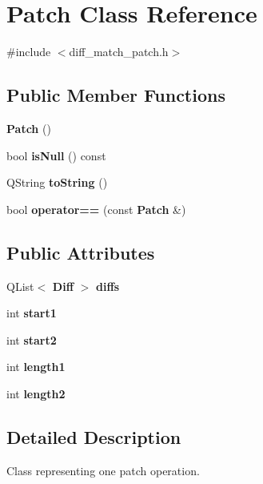 \section{Patch Class Reference}
\label{class_patch}


{\ttfamily \#include $<$diff\_\-match\_\-patch.h$>$}

\subsection*{Public Member Functions}
\begin{DoxyCompactItemize}
\item 
{\bf Patch} ()
\item 
bool {\bfseries isNull} () const \label{class_patch_afdc9aba846465494845201a26d0fc20f}

\item 
QString {\bf toString} ()
\item 
bool {\bfseries operator==} (const {\bf Patch} \&)\label{class_patch_a2159b94942e91391e8d4e29d06735286}

\end{DoxyCompactItemize}
\subsection*{Public Attributes}
\begin{DoxyCompactItemize}
\item 
QList$<$ {\bf Diff} $>$ {\bfseries diffs}\label{class_patch_a5017c7eb1118cc8ebe7030dd7a86475a}

\item 
int {\bfseries start1}\label{class_patch_ae2fbf0aefd6ab5aeec4379cf388ff158}

\item 
int {\bfseries start2}\label{class_patch_a1ceab2853be39f706627f98e4d2ad8d6}

\item 
int {\bfseries length1}\label{class_patch_a6f1d748d94184a8f492bece1f967777d}

\item 
int {\bfseries length2}\label{class_patch_a9ef05324cac27ec93ebd0be4270e9d1e}

\end{DoxyCompactItemize}


\subsection{Detailed Description}
Class representing one patch operation. 

